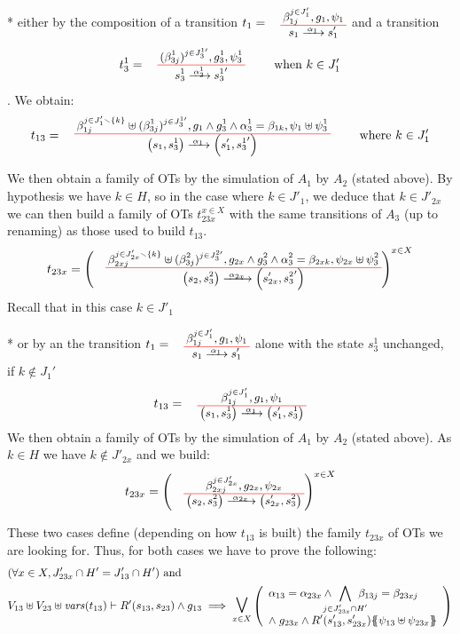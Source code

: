 \documentclass[runningheads]{llncs}
\begin{document}
\begin{enumerate}
* either by the composition of a transition $t_1=\OTx{1}{}{1}{1}$ and a transition \[t_3^1=
\OT{ s^1_3}{{s^1_3}'}{\alpha_3^1}{   {(\beta^1_{3j})^{j \in J^{1 \prime}_3} }}{ g^1_3 }{ \psi^1_3} \qquad \text{ when } k \in J'_{1} 
\]. We obtain:
\[
t_{13} = \OT{\mpar{s_1, s^1_3}}{\mpar{s'_1, {s^1_3}'}}{\alpha_1}{\beta_{1j}^{j \in J'_1 \setminus \{k\}} \uplus  {(\beta^1_{3j})^{j \in J^{1 \prime}_3} }}{g_1 \wedge g^1_3 \wedge \alpha^1_3 = \beta_{1k}}{\psi_1 \uplus \psi^1_3} \qquad \text{ where } k \in J'_{1} 
\]

We then obtain a family of OTs by the simulation of $A_1$ by $A_2$ (stated above).
By hypothesis we have $k \in H$, so in the case where $k \in J'_{1}$, we deduce that $k \in J'_{2x}$ we can  then build  a family of OTs $t_{23x}^{x\in X}$ with the same transitions of $A_3$ (up to renaming) as those used to build $t_{13}$.
\[
t_{23x} = \left(\OT{\mpar{s_2, s^2_3}}{\mpar{s'_{2x}, {s^2_3}'}}{\alpha_{2x}}{\beta_{2xj}^{j \in J'_{2x}  \setminus \{k\}} \uplus   {(\beta^2_{3j})^{j \in J^{2 \prime}_3} }}{g_{2x} \wedge g^2_3 \wedge \alpha^2_3 = \beta_{2xk}}{\psi_{2x} \uplus \psi^2_3}
\right)^{x\in X}\]
Recall that in this case  $k \in J'_{1}$


* or by an the transition $t_1=\OTx{1}{}{1}{1}$ alone with the state $s^1_3$ unchanged, if $k \not\in J_1'$
\[t_{13} = \OT{\mpar{s_1, s^1_3}}{\mpar{s'_1, s^1_3}}{\alpha_1}{\beta_{1j}^{j \in J'_1}}{g_1}{\psi_1}
\]
We then obtain a family of OTs by the simulation of $A_1$ by $A_2$ (stated above).
As  $k \in H$ we have $k \not\in J'_{2x}$ and we build:
\[t_{23x} = \left(
\OT{\mpar{s_2, s^2_3}}{\mpar{s'_{2x}, s^2_3}}{\alpha_{2x}}{\beta_{2xj}^{j \in J'_{2x}}}{g_{2x}}{\psi_{2x}} \right)^{x\in X}\]

\medskip


These two cases define (depending on how $t_{13}$ is built) the family $t_{23x}$ of OTs we are looking for.
Thus, for both cases we have to prove the following:
\begin{align*}		
		&\mpar{\forall x \in X, J'_{23x} \cap H' =
 J'_{13} \cap H'} \text{ and }\\
		&  V_{13} \uplus V_{23} \uplus \fvars{t_{13}} \vdash R'\mpar{s_{13}, s_{23}} \wedge g_{13} \implies \operatorname*{\bigsymb{\bigvee}}_{x \in X} \mpar{\everymath{\displaystyle}\begin{array}{l}
			\alpha_{13} = \alpha_{23x} \wedge \bigwedge_\subbox{j \in J'_{23x} \cap H'} \beta_{13j} = \beta_{23xj} \\[12pt]
			\nwedge g_{23x} \wedge R'\mpar{s'_{13}, s'_{23x}}\psubst{\psi_{13} \uplus \psi_{23x}}
		\end{array}} 
	\end{align*}
	

\end{enumerate}
\end{document}

